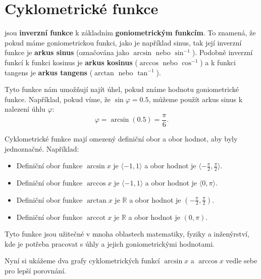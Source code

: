 \documentclass[12pt,a4paper]{article}
\DeclareMathOperator{\arccot}{arccot}
\begin{document}
\section{Cyklometrické funkce}

 jsou \textbf{inverzní funkce} k základním \textbf{goniometrickým funkcím}.
To znamená, že pokud máme goniometrickou funkci, jako je například sinus, 
tak její inverzní funkce je \textbf{arkus sinus} (označována jako $\arcsin$ nebo $\sin^{-1}$).
Podobně inverzní funkcí k funkci kosinus je \textbf{arkus kosinus} ($\arccos$ nebo $\cos^{-1}$) 
a k funkci tangens je \textbf{arkus tangens} ($\arctan$ nebo $\tan^{-1}$).  

Tyto funkce nám umožňují najít úhel, pokud známe hodnotu goniometrické funkce.
Například, pokud víme, že $\sin \varphi = 0.5$, můžeme použít arkus sinus k nalezení úhlu $\varphi$:
\[\varphi = \arcsin(0.5) = \frac{\pi}{6}.\]

Cyklometrické funkce mají omezený definiční obor a obor hodnot, aby byly jednoznačné.
Například:
\begin{itemize}
    \item Definiční obor funkce \textbf{$\arcsin x$} je $\langle-1, 1\rangle$ a obor hodnot je $\langle-\frac{\pi}{2}, \frac{\pi}{2}\rangle$.
    \item Definiční obor funkce \textbf{$\arccos x$} je $\langle-1, 1\rangle$ a obor hodnot je $\langle0, \pi\rangle$.
    \item Definiční obor funkce \textbf{$\arctan x$} je $\mathbb{R}$ a obor hodnot je $\left(-\frac{\pi}{2}, \frac{\pi}{2}\right)$.
    \item Definiční obor funkce \textbf{$\arccot x$} je $\mathbb{R}$ a obor hodnot je $(0, \pi)$.
\end{itemize}

Tyto funkce jsou užitečné v mnoha oblastech matematiky, fyziky a inženýrství, kde je potřeba pracovat s úhly a jejich goniometrickými hodnotami.

Nyní si ukážeme dva grafy cyklometrických funkcí $\arcsin x$ a $\arccos x$ vedle sebe pro lepší porovnání.
\end{document}
